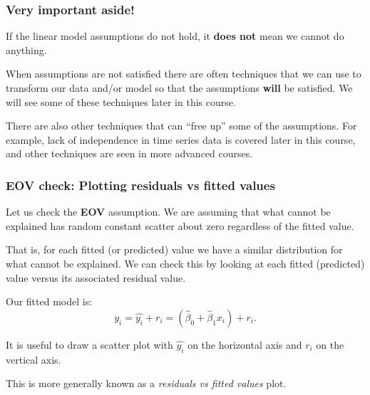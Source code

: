 \documentclass{beamer}\usepackage[]{graphicx}\usepackage[]{xcolor}
\begin{document}
\begin{frame}
\frametitle{Very important aside!}
\begin{Large}
If the linear model assumptions do not hold, it \textbf{does not} mean we cannot do anything. 
\end{Large}
\bigskip

When assumptions are not satisfied there are often techniques that we can use to transform our data and/or model so that the assumptions {\bf will} be satisfied.  We will see some of these techniques later in this course.
\bigskip

There are also other techniques that can ``free up'' some of the assumptions. For example, lack of independence in time series data is covered later in this course, and other techniques are seen in more advanced courses. 

\end{frame}





\begin{frame}[fragile]
\frametitle{EOV check: Plotting residuals vs fitted values}

Let us check the \textbf{EOV} assumption. 
We are assuming that what cannot be explained has random constant scatter about zero 
regardless of the fitted value. 


That is, for each fitted (or predicted) value we have a similar distribution for what cannot be explained. We can check this by looking at each fitted (predicted) value versus its associated residual value. 

Our fitted model is:
\[
y_i=\hat{y_i} + r_i= \left(\hat{\beta}_0+\hat{\beta}_1x_i\right)+r_i.
\]

It is useful to draw a scatter plot with $\hat{y_i}$ on the horizontal axis and $r_i$ on the vertical axis.


This is more generally known as a {\it residuals vs fitted values} plot.

\end{frame}
\end{document}
